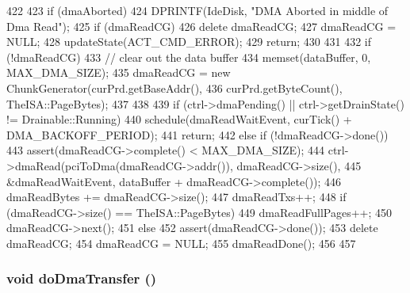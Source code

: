 \begin{DoxyCode}
422 {
423     if (dmaAborted) {
424         DPRINTF(IdeDisk, "DMA Aborted in middle of Dma Read\n");
425         if (dmaReadCG)
426             delete dmaReadCG;
427         dmaReadCG = NULL;
428         updateState(ACT_CMD_ERROR);
429         return;
430     }
431 
432     if (!dmaReadCG) {
433         // clear out the data buffer
434         memset(dataBuffer, 0, MAX_DMA_SIZE);
435         dmaReadCG = new ChunkGenerator(curPrd.getBaseAddr(),
436                 curPrd.getByteCount(), TheISA::PageBytes);
437 
438     }
439     if (ctrl->dmaPending() || ctrl->getDrainState() != Drainable::Running) {
440         schedule(dmaReadWaitEvent, curTick() + DMA_BACKOFF_PERIOD);
441         return;
442     } else if (!dmaReadCG->done()) {
443         assert(dmaReadCG->complete() < MAX_DMA_SIZE);
444         ctrl->dmaRead(pciToDma(dmaReadCG->addr()), dmaReadCG->size(),
445                 &dmaReadWaitEvent, dataBuffer + dmaReadCG->complete());
446         dmaReadBytes += dmaReadCG->size();
447         dmaReadTxs++;
448         if (dmaReadCG->size() == TheISA::PageBytes)
449             dmaReadFullPages++;
450         dmaReadCG->next();
451     } else {
452         assert(dmaReadCG->done());
453         delete dmaReadCG;
454         dmaReadCG = NULL;
455         dmaReadDone();
456     }
457 }
\end{DoxyCode}
\hypertarget{classIdeDisk_aa620b27b5598b2b7590329b64291460d}{
\subsubsection[{doDmaTransfer}]{\setlength{\rightskip}{0pt plus 5cm}void doDmaTransfer ()}}
\label{classIdeDisk_aa620b27b5598b2b7590329b64291460d}



